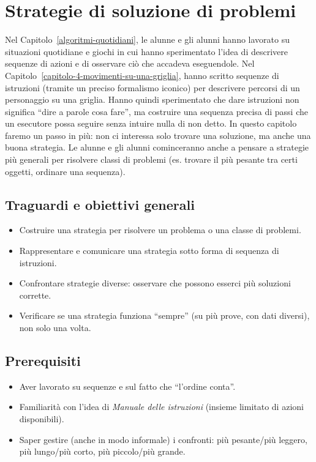 \chapter{Strategie di soluzione di problemi}\label{capitolo-6-strategie-di-soluzione-di-problemi}

Nel Capitolo~\ref{algoritmi-quotidiani}, le alunne e gli alunni hanno lavorato su situazioni quotidiane e giochi in cui hanno sperimentato l'idea di descrivere sequenze di azioni e di osservare ciò che accadeva eseguendole. Nel Capitolo~\ref{capitolo-4-movimenti-su-una-griglia}, hanno scritto sequenze di istruzioni (tramite un preciso formalismo iconico) per descrivere percorsi di un personaggio su una griglia. Hanno quindi sperimentato che dare istruzioni non significa ``dire a parole cosa fare'', ma costruire una sequenza precisa di passi che un esecutore possa seguire senza intuire nulla di non detto. In questo capitolo faremo un passo in più: non ci interessa solo trovare una soluzione, ma anche una buona strategia. Le alunne e gli alunni cominceranno anche a pensare a strategie più generali per risolvere classi di problemi (es. trovare il più pesante tra certi oggetti, ordinare una sequenza).

\section{Traguardi e obiettivi generali }\label{traguardi-e-obiettivi-generali-3}

\begin{itemize}
\item
  Costruire una strategia per risolvere un problema o una classe di problemi.
\item
  Rappresentare e comunicare una strategia sotto forma di sequenza di istruzioni.
\item
  Confrontare strategie diverse: osservare che possono esserci più soluzioni corrette.
\item
  Verificare se una strategia funziona ``sempre'' (su più prove, con dati diversi), non solo una volta.
\end{itemize}

\section{Prerequisiti }\label{prerequisiti-3}

\begin{itemize}
\item
  Aver lavorato su sequenze e sul fatto che ``l'ordine conta''.
\item
  Familiarità con l'idea di \emph{Manuale delle istruzioni} (insieme limitato di azioni disponibili).
\item
  Saper gestire (anche in modo informale) i confronti: più pesante/più leggero, più lungo/più corto, più piccolo/più grande.
\end{itemize}

